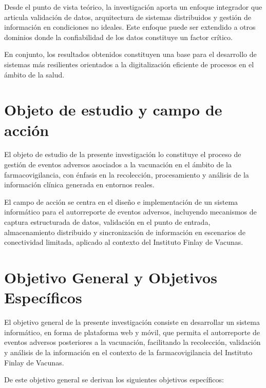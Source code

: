 Desde el punto de vista teórico, la investigación aporta un enfoque integrador que articula validación de datos, arquitectura de sistemas distribuidos y gestión de información en condiciones no ideales. Este enfoque puede ser extendido a otros dominios donde la confiabilidad de los datos constituye un factor crítico.

En conjunto, los resultados obtenidos constituyen una base para el desarrollo de sistemas más resilientes orientados a la digitalización eficiente de procesos en el ámbito de la salud.

\section{Objeto de estudio y campo de acción}\label{section:objetoCampo}

El objeto de estudio de la presente investigación lo constituye el proceso de gestión de eventos adversos asociados a la vacunación en el ámbito de la farmacovigilancia, con énfasis en la recolección, procesamiento y análisis de la información clínica generada en entornos reales.

El campo de acción se centra en el diseño e implementación de un sistema informático para el autorreporte de eventos adversos, incluyendo mecanismos de captura estructurada de datos, validación en el punto de entrada, almacenamiento distribuido y sincronización de información en escenarios de conectividad limitada, aplicado al contexto del Instituto Finlay de Vacunas.

\section{Objetivo General y Objetivos Específicos}\label{section:objetivosPrincipalesEspecificos}

El objetivo general de la presente investigación consiste en desarrollar un sistema informático, en forma de plataforma web y móvil, que permita el autorreporte de eventos adversos posteriores a la vacunación, facilitando la recolección, validación y análisis de la información en el contexto de la farmacovigilancia del Instituto Finlay de Vacunas.

De este objetivo general se derivan los siguientes objetivos específicos:

